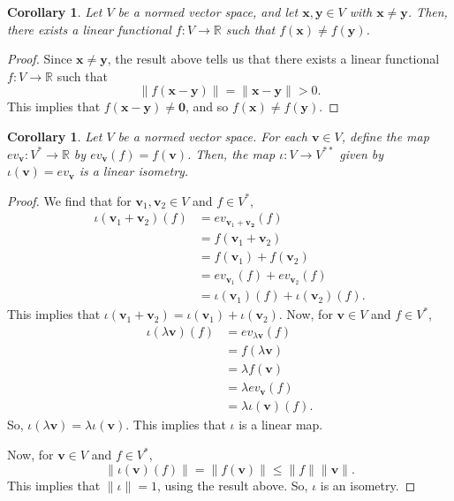 \documentclass[a4paper, openany]{memoir}
\theoremstyle{definition}
\theoremstyle{plain}
\newtheorem{corollary}[definition]{Corollary}
\begin{document}
    \begin{corollary}
        Let $V$ be a normed vector space, and let $\bm{x}, \bm{y} \in V$ with $\bm{x} \neq \bm{y}$. Then, there exists a linear functional $f: V \to \mathbb{R}$ such that $f(\bm{x}) \neq f(\bm{y})$.
    \end{corollary}
    \begin{proof}
        Since $\bm{x} \neq \bm{y}$, the result above tells us that there exists a linear functional $f: V \to \mathbb{R}$ such that 
        \[\lVert f(\bm{x} - \bm{y})\rVert = \lVert \bm{x} - \bm{y} \rVert > 0.\]
        This implies that $f(\bm{x} - \bm{y}) \neq \bm{0}$, and so $f(\bm{x}) \neq f(\bm{y})$.
    \end{proof}
    
    \begin{corollary}
        Let $V$ be a normed vector space. For each $\bm{v} \in V$, define the map $ev_{\bm{v}}: V^* \to \mathbb{R}$ by $ev_{\bm{v}}(f) = f(\bm{v})$. Then, the map $\iota: V \to V^{**}$ given by $\iota(\bm{v}) = ev_{\bm{v}}$ is a linear isometry.
    \end{corollary}
    \begin{proof}
        We find that for $\bm{v}_1, \bm{v}_2 \in V$ and $f \in V^*$,
        \begin{align*}
            \iota(\bm{v}_1 + \bm{v}_2)(f) &= ev_{\bm{v}_1 + \bm{v_2}}(f) \\
            &= f(\bm{v}_1 + \bm{v}_2) \\
            &= f(\bm{v}_1) + f(\bm{v}_2) \\
            &= ev_{\bm{v}_1}(f) + ev_{\bm{v}_2}(f) \\
            &= \iota(\bm{v}_1)(f) + \iota(\bm{v}_2)(f).
        \end{align*}
        This implies that $\iota(\bm{v}_1 + \bm{v}_2) = \iota(\bm{v}_1) + \iota(\bm{v}_2)$. Now, for $\bm{v} \in V$ and $f \in V^*$,
        \begin{align*}
            \iota(\lambda \bm{v})(f) &= ev_{\lambda \bm{v}}(f) \\
            &= f(\lambda \bm{v}) \\
            &= \lambda f(\bm{v}) \\
            &= \lambda ev_{\bm{v}}(f) \\
            &= \lambda \iota (\bm{v})(f).
        \end{align*}
        So, $\iota(\lambda \bm{v}) = \lambda \iota(\bm{v})$. This implies that $\iota$ is a linear map. 

        \noindent Now, for $\bm{v} \in V$ and $f \in V^*$,
        \[\lVert \iota(\bm{v})(f) \rVert = \lVert f(\bm{v}) \rVert \leq \lVert f \rVert \lVert \bm{v} \rVert.\]
        This implies that $\lVert \iota \rVert = 1$, using the result above. So, $\iota$ is an isometry.
    \end{proof}
    
\end{document}
